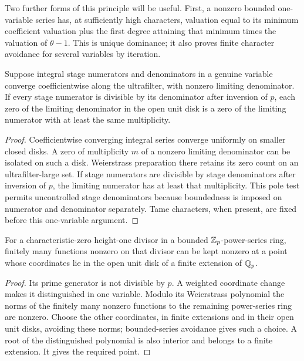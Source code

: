 Two further forms of this principle will be useful.  First, a
nonzero bounded one-variable series has, at sufficiently high
characters, valuation equal to its minimum coefficient valuation
plus the first degree attaining that minimum times the valuation
of $\theta-1$.  This is unique dominance; it also proves finite
character avoidance for several variables by iteration.

\begin{lemma}\label{models:poles}
Suppose integral stage numerators and denominators in a genuine
variable converge coefficientwise along the ultrafilter, with
nonzero limiting denominator.  If every stage numerator is
divisible by its denominator after inversion of $p$, each zero
of the limiting denominator in the open unit disk is a zero
of the limiting numerator with at least the same multiplicity.
\end{lemma}

\begin{proof}
Coefficientwise converging integral series converge uniformly on
smaller closed disks.  A zero of multiplicity $m$ of a nonzero
limiting denominator can be isolated on such a disk.  Weierstrass
preparation there retains its zero count on an ultrafilter-large
set.  If stage numerators are divisible by stage denominators after
inversion of $p$, the limiting numerator has at least that
multiplicity.  This pole test permits uncontrolled stage
denominators because boundedness is imposed on numerator and
denominator separately.  Tame characters, when present, are fixed
before this one-variable argument.
\end{proof}

\begin{lemma}\label{models:field-points}
For a characteristic-zero height-one divisor in a bounded
$\mathbb Z_p$-power-series ring, finitely many functions nonzero on that
divisor can be kept nonzero at a point whose coordinates lie in the
open unit disk of a finite extension of $\mathbb Q_p$.
\end{lemma}

\begin{proof}
Its prime generator is not divisible by $p$.  A weighted coordinate
change makes it distinguished in one variable.  Modulo its
Weierstrass polynomial the norms of the finitely many nonzero
functions to the remaining power-series ring are nonzero.  Choose
the other coordinates, in finite extensions and in their open
unit disks, avoiding these norms; bounded-series avoidance gives
such a choice.  A root of the distinguished polynomial is also
interior and belongs to a finite extension.  It gives the required
point.
\end{proof}

